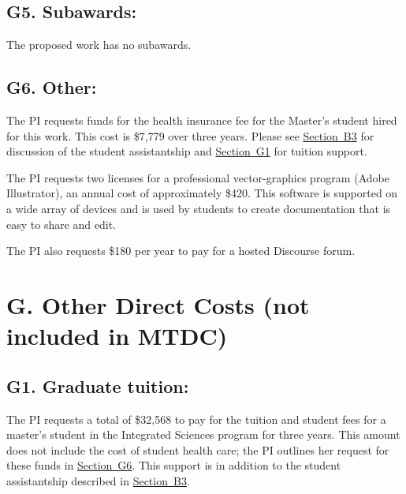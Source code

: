 \documentclass[11pt,oneside]{memoir}
\begin{document}
\subsection*{G5. Subawards:}
The proposed work has no subawards.

\subsection*{G6. Other:}
\label{sec:masters-health}
The PI requests funds for the health insurance fee for the Master's student hired for this work.  This cost is \$7,779 over three years.  Please see \hyperref[sec:masters-student-salary]{Section~B3} for discussion of the student assistantship and \hyperref[sec:masters-tuition]{Section~G1} for tuition support.

The PI requests two licenses for a professional vector-graphics program (Adobe Illustrator), an annual cost of approximately \$420. This software is supported on a wide array of devices and is used by students to create documentation that is easy to share and edit.

The PI also requests \$180 per year to pay for a hosted Discourse forum.



\section*{G. Other Direct Costs (not included in MTDC)}
%

\subsection{G1. Graduate tuition:}
\label{sec:masters-tuition}
The PI requests a total of \$32,568 to pay for the tuition and student fees for a master's student in the Integrated Sciences program for three years.  This amount does not include the cost of student health care; the PI outlines her request for these funds in \hyperref[sec:masters-health]{Section~G6}. This support is in addition to the student assistantship described in 
\hyperref[sec:masters-student-salary]{Section~B3}.
\end{document}
